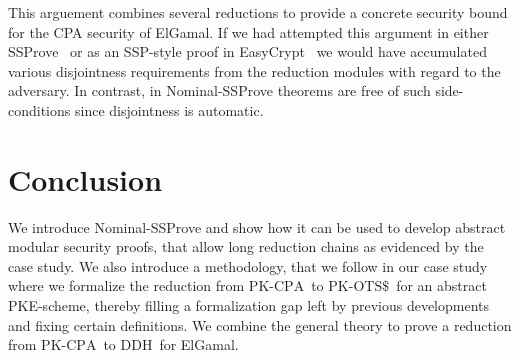 \documentclass[a4paper,USenglish,cleveref, autoref]{lipics-v2021}
\newcommand{\CPA}{\ensuremath{\mathrm{PK\text{-}CPA}}}
\newcommand{\OTSR}{\ensuremath{\mathrm{PK\text{-}OTS\$}}}
\newcommand{\DDH}{\ensuremath{\mathrm{DDH}}}
\begin{document}
  This arguement combines several reductions to provide a concrete security bound for the CPA security of ElGamal.
  If we had attempted this argument in either SSProve~\cite{haselwarter23popl}
  or as an SSP-style proof in EasyCrypt~\cite{dupressoir22csf}
  we would have accumulated various disjointness requirements from the reduction modules
  with regard to the adversary.
  In contrast, in Nominal-SSProve theorems are free of such side-conditions since disjointness
  is automatic.
  

\section{Conclusion}\label{sec:conclusion}

We introduce Nominal-SSProve and show how it can be used to develop abstract modular
security proofs, that allow long reduction chains as evidenced by the case study.
We also introduce a methodology, that we follow in our case study
where we formalize the reduction from \CPA\ to \OTSR\ for an abstract PKE-scheme,
thereby filling a formalization gap left by previous developments and fixing certain definitions.
We combine the general theory to prove a reduction from \CPA\ to \DDH\ for ElGamal.



\end{document}
